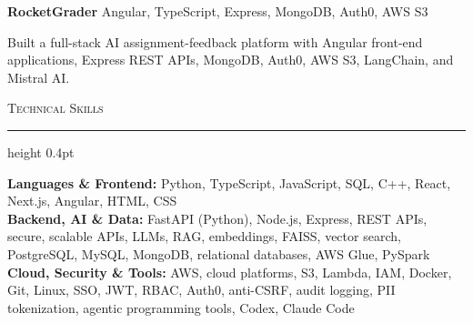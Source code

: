 \documentclass[letterpaper,11pt]{article}
\newcommand{\resumesection}[1]{%
  \par\vspace{2pt}%
  {\large\scshape #1}\par\vspace{2pt}%
  \hrule height 0.4pt\vspace{2pt}%
}
\newcommand{\projectHeading}[2]{
  \textbf{#1} \hfill #2
}
\begin{document}
\projectHeading{RocketGrader}{Angular, TypeScript, Express, MongoDB, Auth0, AWS S3}
\begin{tightitemize}
  \item Built a full-stack AI assignment-feedback platform with Angular front-end applications, Express REST APIs, MongoDB, Auth0, AWS S3, LangChain, and Mistral AI.
\end{tightitemize}

\resumesection{Technical Skills}
\textbf{Languages \& Frontend:} Python, TypeScript, JavaScript, SQL, C++, React, Next.js, Angular, HTML, CSS\\
\textbf{Backend, AI \& Data:} FastAPI (Python), Node.js, Express, REST APIs, secure, scalable APIs, LLMs, RAG, embeddings, FAISS, vector search, PostgreSQL, MySQL, MongoDB, relational databases, AWS Glue, PySpark\\
\textbf{Cloud, Security \& Tools:} AWS, cloud platforms, S3, Lambda, IAM, Docker, Git, Linux, SSO, JWT, RBAC, Auth0, anti-CSRF, audit logging, PII tokenization, agentic programming tools, Codex, Claude Code
\end{document}
